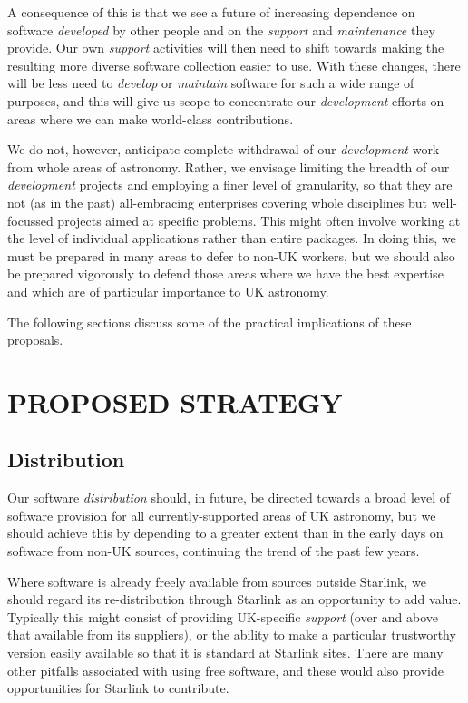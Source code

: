 \documentclass[twoside,11pt]{article}
\newcommand{\htmlref}[2]{#1}
\newcommand{\st}[1]{{\em{#1}}}
\newcommand{\dis}[1]{\htmlref{#1}{distribution}}
\newcommand{\spt}[1]{\htmlref{#1}{support}}
\begin{document}
A consequence of this is that we see a future of increasing dependence
on software \st{developed} by other people and on the \st{support}
and \st{maintenance} they provide.  Our own \st{support} activities
will then need to shift towards making the resulting more diverse
software collection easier to use.  With these changes, there will be
less need to \st{develop} or \st{maintain} software for such a wide
range of purposes, and this will give us scope to concentrate our
\st{development} efforts on areas where we can make world-class
contributions.

We do not, however, anticipate complete withdrawal of our
\st{development} work from whole areas of astronomy.  Rather, we
envisage limiting the breadth of our \st{development} projects and
employing a finer level of granularity, so that they are not (as in
the past) all-embracing enterprises covering whole disciplines but
well-focussed projects aimed at specific problems. This might often
involve working at the level of individual applications rather than
entire packages.  In doing this, we must be prepared in many areas to
defer to non-UK workers, but we should also be prepared vigorously to
defend those areas where we have the best expertise and which are of
particular importance to UK astronomy.

The following sections discuss some of the practical implications of
these proposals.

\section{PROPOSED STRATEGY}

\subsection{Distribution}

Our software \st{\dis{distribution}} should, in future, be directed towards
a broad level of software provision for all currently-supported areas
of UK astronomy, but we should achieve this by depending to a greater
extent than in the early days on software from non-UK sources,
continuing the trend of the past few years.

Where software is already freely available from sources outside
Starlink, we should regard its re-distribution through Starlink as
an opportunity to add value. Typically this might consist of providing
UK-specific \st{\spt{support}} (over and above that available from its
suppliers), or the ability to make a particular trustworthy version
easily available so that it is standard at Starlink sites.  There are
many other pitfalls associated with using free software, and these
would also provide opportunities for Starlink to contribute.
\end{document}
